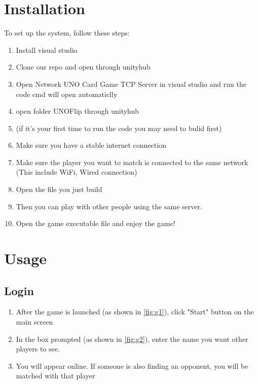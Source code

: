 \documentclass[12pt, titlepage]{article}
\begin{document}
\section{Installation}
To set up the system, follow these steps:
\begin{enumerate}
    \item Install visual studio
    \item Clone our repo and open through unityhub
    \item Open Network UNO Card Game TCP Server in visual studio and run the code cmd will open automaticlly
    \item open folder UNOFlip through unityhub
    \item (if it's your first time to run the code you may need to bulid first)
    \item Make sure you have a stable internet connection
    \item Make sure the player you want to match is connected to the same network (This include WiFi, Wired connection)
    \item Open the file you just build 
    \item Then you can play with other people using the same server.
    
    \item Open the game executable file and enjoy the game!
\end{enumerate}

\section{Usage}
\subsection{Login}
\begin{enumerate}
    \item After the game is launched (as shown in \autoref{fig:g1}), click "Start" button on the main screen
    \item In the box prompted (as shown in \autoref{fig:g2}), enter the name you want other players to see.
    \item You will appear online. If someone is also finding an opponent, you will be matched with that player
\end{enumerate}
\end{document}
